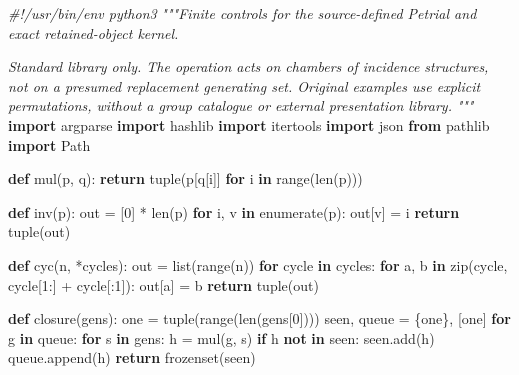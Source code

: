 \documentclass[
  10pt,
  letterpaper,
]{article}
\newenvironment{Shaded}{}{}
\newcommand{\BuiltInTok}[1]{\textcolor[rgb]{0.00,0.50,0.00}{#1}}
\newcommand{\CommentTok}[1]{\textcolor[rgb]{0.38,0.63,0.69}{\textit{#1}}}
\newcommand{\ControlFlowTok}[1]{\textcolor[rgb]{0.00,0.44,0.13}{\textbf{#1}}}
\newcommand{\DecValTok}[1]{\textcolor[rgb]{0.25,0.63,0.44}{#1}}
\newcommand{\ImportTok}[1]{\textcolor[rgb]{0.00,0.50,0.00}{\textbf{#1}}}
\newcommand{\KeywordTok}[1]{\textcolor[rgb]{0.00,0.44,0.13}{\textbf{#1}}}
\newcommand{\NormalTok}[1]{#1}
\newcommand{\OperatorTok}[1]{\textcolor[rgb]{0.40,0.40,0.40}{#1}}
\begin{document}
\begin{Shaded}
\begin{Highlighting}[]
\CommentTok{\#!/usr/bin/env python3}
\CommentTok{"""Finite controls for the source{-}defined Petrial and exact retained{-}object kernel.}

\CommentTok{Standard library only. The operation acts on chambers of incidence structures,}
\CommentTok{not on a presumed replacement generating set. Original examples use explicit}
\CommentTok{permutations, without a group catalogue or external presentation library.}
\CommentTok{"""}
\ImportTok{import}\NormalTok{ argparse}
\ImportTok{import}\NormalTok{ hashlib}
\ImportTok{import}\NormalTok{ itertools}
\ImportTok{import}\NormalTok{ json}
\ImportTok{from}\NormalTok{ pathlib }\ImportTok{import}\NormalTok{ Path}


\KeywordTok{def}\NormalTok{ mul(p, q):}
    \ControlFlowTok{return} \BuiltInTok{tuple}\NormalTok{(p[q[i]] }\ControlFlowTok{for}\NormalTok{ i }\KeywordTok{in} \BuiltInTok{range}\NormalTok{(}\BuiltInTok{len}\NormalTok{(p)))}


\KeywordTok{def}\NormalTok{ inv(p):}
\NormalTok{    out }\OperatorTok{=}\NormalTok{ [}\DecValTok{0}\NormalTok{] }\OperatorTok{*} \BuiltInTok{len}\NormalTok{(p)}
    \ControlFlowTok{for}\NormalTok{ i, v }\KeywordTok{in} \BuiltInTok{enumerate}\NormalTok{(p):}
\NormalTok{        out[v] }\OperatorTok{=}\NormalTok{ i}
    \ControlFlowTok{return} \BuiltInTok{tuple}\NormalTok{(out)}


\KeywordTok{def}\NormalTok{ cyc(n, }\OperatorTok{*}\NormalTok{cycles):}
\NormalTok{    out }\OperatorTok{=} \BuiltInTok{list}\NormalTok{(}\BuiltInTok{range}\NormalTok{(n))}
    \ControlFlowTok{for}\NormalTok{ cycle }\KeywordTok{in}\NormalTok{ cycles:}
        \ControlFlowTok{for}\NormalTok{ a, b }\KeywordTok{in} \BuiltInTok{zip}\NormalTok{(cycle, cycle[}\DecValTok{1}\NormalTok{:] }\OperatorTok{+}\NormalTok{ cycle[:}\DecValTok{1}\NormalTok{]):}
\NormalTok{            out[a] }\OperatorTok{=}\NormalTok{ b}
    \ControlFlowTok{return} \BuiltInTok{tuple}\NormalTok{(out)}


\KeywordTok{def}\NormalTok{ closure(gens):}
\NormalTok{    one }\OperatorTok{=} \BuiltInTok{tuple}\NormalTok{(}\BuiltInTok{range}\NormalTok{(}\BuiltInTok{len}\NormalTok{(gens[}\DecValTok{0}\NormalTok{])))}
\NormalTok{    seen, queue }\OperatorTok{=}\NormalTok{ \{one\}, [one]}
    \ControlFlowTok{for}\NormalTok{ g }\KeywordTok{in}\NormalTok{ queue:}
        \ControlFlowTok{for}\NormalTok{ s }\KeywordTok{in}\NormalTok{ gens:}
\NormalTok{            h }\OperatorTok{=}\NormalTok{ mul(g, s)}
            \ControlFlowTok{if}\NormalTok{ h }\KeywordTok{not} \KeywordTok{in}\NormalTok{ seen:}
\NormalTok{                seen.add(h)}
\NormalTok{                queue.append(h)}
    \ControlFlowTok{return} \BuiltInTok{frozenset}\NormalTok{(seen)}



\end{Highlighting}
\end{Shaded}
\end{document}
